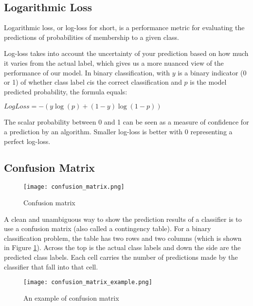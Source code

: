 \subsection{Logarithmic Loss}

Logarithmic loss, or log-loss for short, is a performance metric for evaluating the predictions of probabilities of membership to a given class.

Log-loss takes into account the uncertainty of your prediction based on how much it varies from the actual label, which gives us a more nuanced view of the performance of our model. In binary classification, with $y$ is a binary indicator (0 or 1) of whether class label $c $is the correct classification and $p$ is the model predicted probability, the formula equals:

\bigskip
\begin{center}
    $LogLoss = -(y\log(p) + (1 - y)\log(1 - p))$
\end{center}
\bigskip

The scalar probability between 0 and 1 can be seen as a measure of confidence for a prediction by an algorithm. Smaller log-loss is better with 0 representing a perfect log-loss.

\subsection{Confusion Matrix}
\label{ssec:confusion_matrix}

\begin{figure}[H]
    \centering    
    \texttt{[image: confusion\_matrix.png]}
    \caption{Confusion matrix \cite{wiki_confusion_matrix}}
    \label{fig:confusion_matrix}
\end{figure}

A clean and unambiguous way to show the prediction results of a classifier is to use a confusion matrix (also called a contingency table).
For a binary classification problem, the table has two rows and two columns (which is shown in Figure \ref{fig:confusion_matrix}). Across the top is the actual class labels and down the side are the predicted class labels. Each cell carries the number of predictions made by the classifier that fall into that cell.

\begin{figure}[H]
    \centering    
    \texttt{[image: confusion\_matrix\_example.png]}
    \caption{An example of confusion matrix}
    \label{fig:confusion_matrix_example}
\end{figure}

